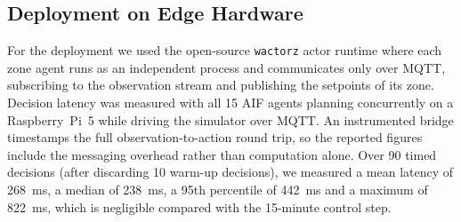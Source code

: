 \documentclass[conference]{IEEEtran}
\begin{document}
\subsection{Deployment on Edge Hardware}
\label{sec:latency}

For the deployment we used the open-source
\texttt{wactorz} actor runtime where each zone agent runs as an independent process and communicates only over MQTT, subscribing
to the observation stream and publishing the setpoints of its zone. 
Decision latency was measured with all 15 AIF agents planning concurrently on a
Raspberry~Pi~5 while driving the simulator over MQTT. An instrumented bridge
timestamps the full observation-to-action round trip, so the reported figures
include the messaging overhead rather than computation alone. Over 90 timed
decisions (after discarding 10 warm-up decisions), we measured a mean latency of
\SI{268}{\milli\second}, a median of \SI{238}{\milli\second}, a 95th percentile
of \SI{442}{\milli\second} and a maximum of \SI{822}{\milli\second}, which is
negligible compared with the 15-minute control step.



\end{document}
